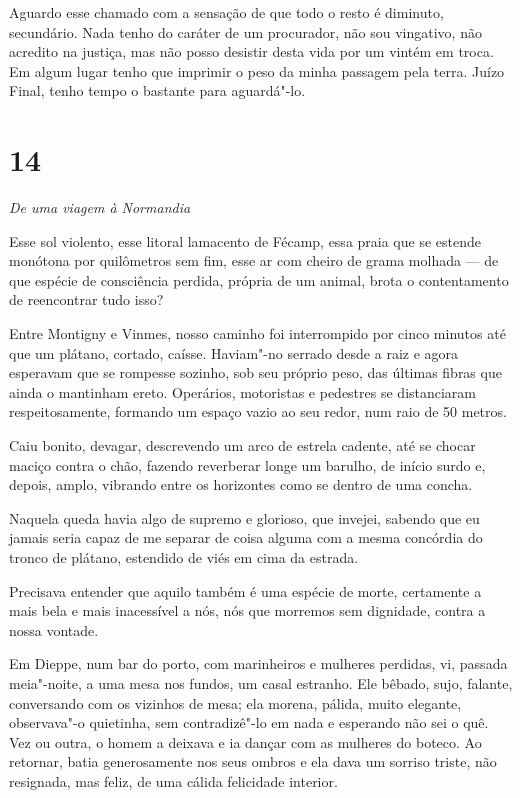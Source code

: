 Aguardo esse chamado com a sensação de que todo o resto é diminuto,
secundário. Nada tenho do caráter de um procurador, não sou vingativo,
não acredito na justiça, mas não posso desistir desta vida por um vintém
em troca. Em algum lugar tenho que imprimir o peso da minha passagem
pela terra. Juízo Final, tenho tempo o bastante para aguardá"-lo.

\section{14}

\emph{De uma viagem à Normandia}

Esse sol violento, esse litoral lamacento de Fécamp, essa praia que se
estende monótona por quilômetros sem fim, esse ar com cheiro de grama
molhada --- de que espécie de consciência perdida, própria de um animal,
brota o contentamento de reencontrar tudo isso?

Entre Montigny e Vinmes, nosso caminho foi interrompido por cinco
minutos até que um plátano, cortado, caísse. Haviam"-no serrado desde a
raiz e agora esperavam que se rompesse sozinho, sob seu próprio peso,
das últimas fibras que ainda o mantinham ereto. Operários, motoristas e
pedestres se distanciaram respeitosamente, formando um espaço vazio ao
seu redor, num raio de 50 metros.

Caiu bonito, devagar, descrevendo um arco de estrela cadente, até se
chocar maciço contra o chão, fazendo reverberar longe um barulho, de
início surdo e, depois, amplo, vibrando entre os horizontes como se
dentro de uma concha.

Naquela queda havia algo de supremo e glorioso, que invejei, sabendo que
eu jamais seria capaz de me separar de coisa alguma com a mesma
concórdia do tronco de plátano, estendido de viés em cima da estrada.

Precisava entender que aquilo também é uma espécie de morte, certamente
a mais bela e mais inacessível a nós, nós que morremos sem dignidade,
contra a nossa vontade.

\asterisc

Em Dieppe, num bar do porto, com marinheiros e mulheres perdidas, vi,
passada meia"-noite, a uma mesa nos fundos, um casal estranho. Ele
bêbado, sujo, falante, conversando com os vizinhos de mesa; ela morena,
pálida, muito elegante, observava"-o quietinha, sem contradizê"-lo em nada
e esperando não sei o quê. Vez ou outra, o homem a deixava e ia dançar
com as mulheres do boteco. Ao retornar, batia generosamente nos seus
ombros e ela dava um sorriso triste, não resignada, mas feliz, de uma
cálida felicidade interior.

